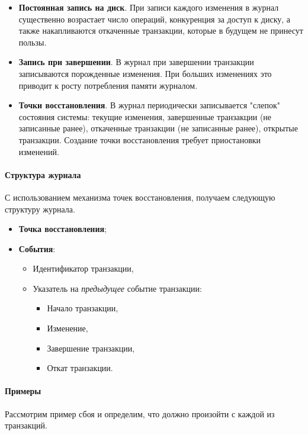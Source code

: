 \begin{itemize}
	\item \textbf{Постоянная запись на диск}. При записи каждого изменения в
	      журнал существенно возрастает число операций, конкуренция за доступ к диску, а также накапливаются
	      откаченные транзакции, которые в будущем не принесут пользы.
	\item \textbf{Запись при завершении}. В журнал при завершении транзакции
	      записываются порожденные изменения. При больших изменениях это приводит к росту потребления памяти
	      журналом.
	\item \textbf{Точки восстановления}. В журнал периодически записывается
	      "слепок" состояния системы: текущие изменения, завершенные транзакции
	      (не записанные ранее), откаченные транзакции (не записанные ранее),
	      открытые транзакции. Создание точки восстановления требует приостановки изменений.
\end{itemize}

\paragraph{Структура журнала}

С использованием механизма точек восстановления, получаем следующую структуру журнала.

\begin{itemize}
	\item \textbf{Точка восстановления};
	\item \textbf{События}:
	      \begin{itemize}
		      \item Идентификатор транзакции,
		      \item Указатель на \textit{предыдущее} событие транзакции:
		            \begin{itemize}
			            \item Начало транзакции,
			            \item Изменение,
			            \item Завершение транзакции,
			            \item Откат транзакции.
		            \end{itemize}
	      \end{itemize}
\end{itemize}

\paragraph{Примеры}
Рассмотрим пример сбоя и определим, что должно произойти с каждой из транзакций.


